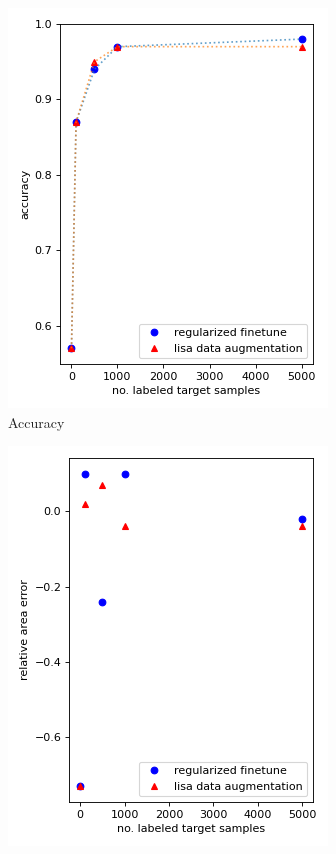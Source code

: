 \documentclass[10pt,twocolumn,letterpaper]{article}
\begin{document}
\begin{figure}[htp]
\centering
\begin{subfigure}{.3\textwidth}
    \centering
    \includegraphics[width=.95\linewidth]{y_acc.png}  
    \caption{Accuracy}
\end{subfigure}
\begin{subfigure}{.3\textwidth}
    \centering
    \includegraphics[width=.95\linewidth]{y_area.png}  

\end{subfigure}
\end{figure}
\end{document}
